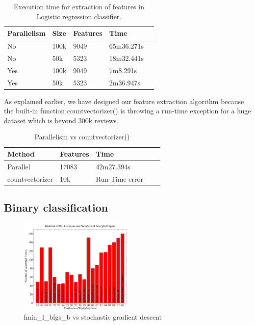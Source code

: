 \documentclass{article}
\begin{document}
\begin{table}[H]
\caption{Execution time for extraction of features in Logistic regression classifier.}
\label{sample-table}
\begin{center}
\begin{small}
\begin{sc}
\begin{tabular}{lllll}
\hline
Parallelism & Size & Features & Time \\
\hline
No  & 100k & 9049 & 65m36.271s \\
No  & 50k & 5323 & 18m32.441s \\
Yes  & 100k & 9049 & 7m8.291s \\
Yes  & 50k & 5323 & 2m36.947s \\
\hline
\end{tabular}
\end{sc}
\end{small}
\end{center}
\end{table}


As explained earlier, we have designed our feature extraction algorithm because the built-in function countvectorizer() is throwing a run-time exception for a huge dataset which is beyond 300k reviews.


\begin{table}[H]
\caption{Parallelism vs countvectorizer()}
\label{sample-table}
\begin{center}
\begin{small}
\begin{sc}
\begin{tabular}{lllll}
\hline
Method & Features & Time \\
\hline
Parallel  & 17083 & 42m27.394s \\
countvectorizer  & 10k & Run-Time error \\
\hline
\end{tabular}
\end{sc}
\end{small}
\end{center}
\end{table}


\subsection{Binary classification}


\begin{figure}[H]
  \caption{fmin\_l\_bfgs\_b vs stochastic gradient descent}
  \centering
    \includegraphics[width=0.5\textwidth]{icml_numpapers}
\end{figure}
\end{document}
